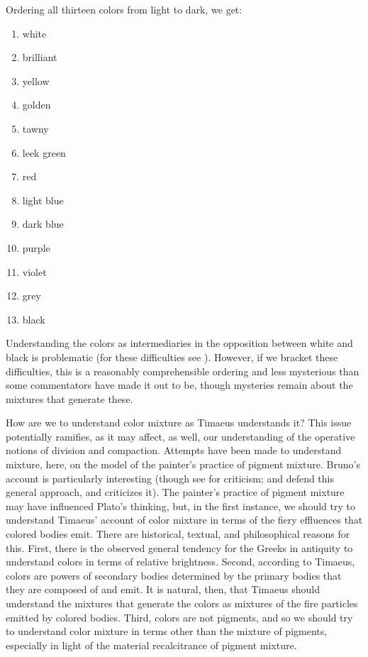Ordering all thirteen colors from light to dark, we get:
\begin{enumerate}
	\item white
	\item brilliant
	\item yellow
	\item golden
	\item tawny
	\item leek green
	\item red
	\item light blue
	\item dark blue
	\item purple
	\item violet
	\item grey
	\item black
\end{enumerate}
Understanding the colors as intermediaries in the opposition between white and black is problematic (for these difficulties see \citealt[chapter 6.3]{Kalderon:2015fr}). However, if we bracket these difficulties, this is a reasonably comprehensible ordering and less mysterious than some commentators have made it out to be, though mysteries remain about the mixtures that generate these.

How are we to understand color mixture as Timaeus understands it? This issue potentially ramifies, as it may affect, as well, our understanding of the operative notions of division and compaction. Attempts have been made to understand mixture, here, on the model of the painter's practice of pigment mixture. Bruno's \citeyearpar[chapter 10]{Bruno:1977fk} account is particularly interesting (though see \citealt[]{Gage:1993aa} for criticism; \citealt[278]{Cornford:1935fk} and \citealt{Levides:2002aa} defend this general approach, and \citealt{Struycken:2003zr} criticizes it). The painter's practice of pigment mixture may have influenced Plato's thinking, but, in the first instance, we should try to understand Timaeus' account of color mixture in terms of the fiery effluences that colored bodies emit. There are historical, textual, and philosophical reasons for this. First, there is the observed general tendency for the Greeks in antiquity to understand colors in terms of relative brightness. Second, according to Timaeus, colors are powers of secondary bodies determined by the primary bodies that they are composed of and emit. It is natural, then, that Timaeus should understand the mixtures that generate the colors as mixtures of the fire particles emitted by colored bodies. Third, colors are not pigments, and so we should try to understand color mixture in terms other than the mixture of pigments, especially in light of the material recalcitrance of pigment mixture.

